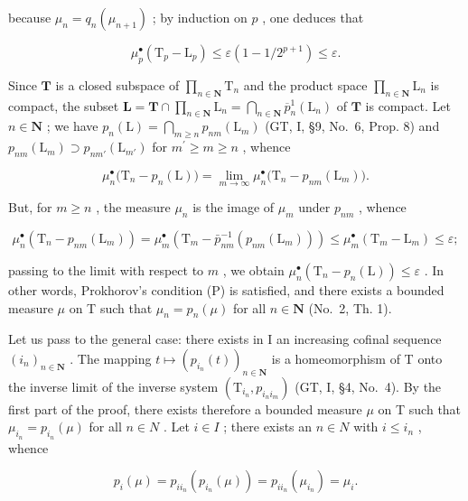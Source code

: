 because \(\mu_{n} = q_{n}(\mu_{n + 1})\) ; by induction on \(p\) , one deduces that

\[
\mu_ {p} ^ {\bullet} \left(\mathrm{T} _ {p} - \mathrm{L} _ {p}\right) \leqslant \varepsilon \left(1 - 1 / 2 ^ {p + 1}\right) \leqslant \varepsilon .
\]

Since \(\mathbf{T}\) is a closed subspace of \(\prod_{n\in \mathbf{N}}\mathrm{T}_n\) and the product space \(\prod_{n\in \mathbf{N}}\mathrm{L}_n\) is compact, the subset \(\mathbf{L} = \mathbf{T}\cap \prod_{n\in \mathbf{N}}\mathrm{L}_n = \bigcap_{n\in \mathbf{N}}\overline{p}_n^1 (\mathrm{L}_n)\) of \(\mathbf{T}\) is compact. Let \(n\in \mathbf{N}\) ; we have \(p_n(\mathrm{L}) = \bigcap_{m\geqslant n}p_{nm}(\mathrm{L}_m)\) (GT, I, §9, No.~6, Prop. 8) and \(p_{nm}(\mathrm{L}_m)\supset p_{nm'}(\mathrm{L}_{m'})\) for \(m^{\prime}\geqslant m\geqslant n\) , whence

\[
\mu_ {n} ^ {\bullet} \big (\mathrm{T} _ {n} - p _ {n} (\mathrm{L}) \big) = \lim _ {m \rightarrow \infty} \mu_ {n} ^ {\bullet} \big (\mathrm{T} _ {n} - p _ {n m} (\mathrm{L} _ {m}) \big).
\]

But, for \(m \geqslant n\) , the measure \(\mu_{n}\) is the image of \(\mu_{m}\) under \(p_{nm}\) , whence

\[
\mu_ {n} ^ {\bullet} \left(\mathrm{T} _ {n} - p _ {n m} (\mathrm{L} _ {m})\right) = \mu_ {m} ^ {\bullet} \left(\mathrm{T} _ {m} - \bar {p} _ {n m} ^ {- 1} (p _ {n m} (\mathrm{L} _ {m}))\right) \leqslant \mu_ {m} ^ {\bullet} \left(\mathrm{T} _ {m} - \mathrm{L} _ {m}\right) \leqslant \varepsilon ;
\]

passing to the limit with respect to \(m\) , we obtain \(\mu_n^\bullet (\mathrm{T}_n - p_n(\mathrm{L})) \leqslant \varepsilon\) . In other words, Prokhorov's condition (P) is satisfied, and there exists a bounded measure \(\mu\) on T such that \(\mu_n = p_n(\mu)\) for all \(n \in \mathbf{N}\) (No.~2, Th. 1).

Let us pass to the general case: there exists in I an increasing cofinal sequence \((i_{n})_{n\in\mathbf{N}}\) . The mapping \(t\mapsto\left(p_{i_{n}}(t)\right)_{n\in\mathbf{N}}\) is a homeomorphism of T onto the inverse limit of the inverse system \((\mathrm{T}_{i_{n}},p_{i_{n}i_{m}})\) (GT, I, §4, No.~4). By the first part of the proof, there exists therefore a bounded measure \(\mu\) on T such that \(\mu_{i_{n}}=p_{i_{n}}(\mu)\) for all \(n\in N\) . Let \(i\in I\) ; there exists an \(n\in N\) with \(i\leqslant i_{n}\) , whence

\[
p _ {i} (\mu) = p _ {i i _ {n}} \left(p _ {i _ {n}} (\mu)\right) = p _ {i i _ {n}} \left(\mu_ {i _ {n}}\right) = \mu_ {i}.\tag{Q.E.D.}
\]

